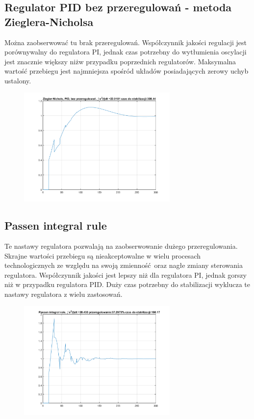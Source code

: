 \documentclass[a4paper, 12pt]{article}
\begin{document}
		\subsection{Regulator PID bez przeregulowań - metoda Zieglera-Nicholsa}
			Można zaobserwować tu brak przeregulowań. Współczynnik jakości regulacji jest porównywalny do regulatora PI, jednak czas potrzebny do wytłumienia oscylacji jest znacznie większy niż\linebreak w przypadku poprzednich regulatorów. Maksymalna wartość przebiegu jest najmniejsza spośród układów posiadających zerowy uchyb ustalony.
			\begin{figure}[H]
				\centering
				\includegraphics[width = 0.7\textwidth]{./img/ZN_PID_no.png}
			\end{figure}
		\subsection{Passen integral rule}
			Te nastawy regulatora pozwalają na zaobserwowanie dużego przeregulowania. Skrajne wartości przebiegu są nieakceptowalne w wielu procesach technologicznych ze względu na swoją zmienność oraz nagłe zmiany sterowania regulatora. Współczynnik jakości jest lepszy niż dla regulatora PI, jednak gorszy niż w przypadku regulatora PID. Duży czas potrzebny do stabilizacji wyklucza te nastawy regulatora z wielu zastosowań.
			\begin{figure}[H]
				\centering
				\includegraphics[width = 0.7\textwidth]{./img/passen.png}
			\end{figure}
\end{document}
